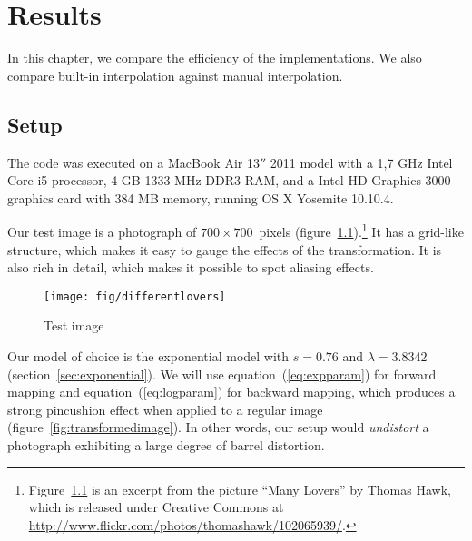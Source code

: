 \documentclass[english,12pt]{ifimaster}
\begin{document}


\chapter{Results}
\label{chap:results}

In this chapter, we compare the efficiency of the implementations. We
also compare built-in interpolation against manual interpolation.

\section{Setup}

The code was executed on a MacBook Air 13$''$ 2011 model with a 1,7
GHz Intel Core i5 processor, 4 GB 1333 MHz DDR3 RAM, and a Intel HD
Graphics 3000 graphics card with 384 MB memory, running OS X Yosemite
10.10.4.

Our test image is a photograph of $700 \times 700$~pixels
(figure~\ref{fig:testimage}).\footnote{Figure~\ref{fig:testimage} is
  an excerpt from the picture ``Many Lovers'' by Thomas Hawk, which is
  released under Creative Commons at
  \url{http://www.flickr.com/photos/thomashawk/102065939/}.} It has a
grid-like structure, which makes it easy to gauge the effects of the
transformation. It is also rich in detail, which makes it possible to
spot aliasing effects.

\begin{figure}
  \centering
  \texttt{[image: fig/differentlovers]}
  \caption{Test image}
  \label{fig:testimage}
\end{figure}

Our model of choice is the exponential model with $s = 0.76$ and
$\lambda = 3.8342$ (section~\ref{sec:exponential}). We will use
equation~(\ref{eq:expparam}) for forward mapping and
equation~(\ref{eq:logparam}) for backward mapping, which produces a
strong pincushion effect when applied to a regular image
(figure~\ref{fig:transformedimage}). In other words, our setup would
\emph{undistort} a photograph exhibiting a large degree of barrel
distortion.
\end{document}
